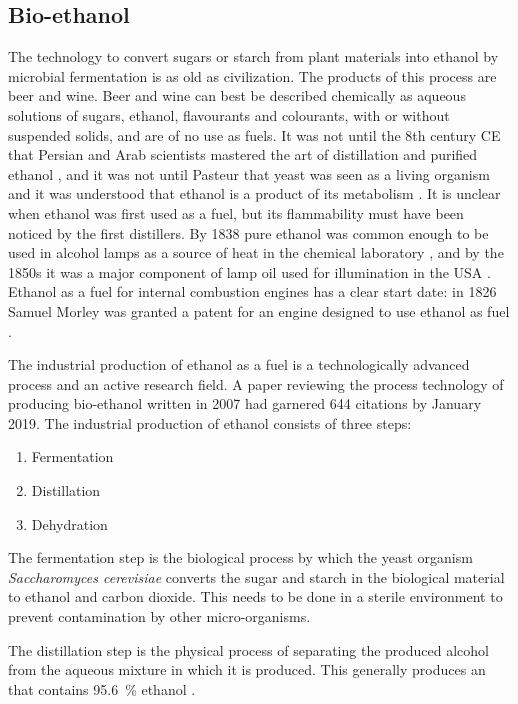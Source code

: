 \subsection{Bio-ethanol}
\label{sec:BioEthanol}

The technology to convert sugars or starch from plant materials into ethanol by
microbial fermentation is as old as civilization. The products of this process
are beer and wine.  Beer and wine can best be described chemically as aqueous
solutions of sugars, ethanol, flavourants and colourants, with or without
suspended solids, and are of no use as fuels. It was not until the 8th century
CE that Persian and Arab scientists mastered the art of distillation and
purified ethanol \autocite{Modanlou2008}, and it was not until Pasteur that
yeast was seen as a living organism and it was understood that ethanol is a
product of its metabolism \autocite{Barnett2000}. It is unclear when ethanol was
first used as a fuel, but its flammability must have been noticed by the first
distillers. By 1838 pure ethanol was common enough to be used in alcohol lamps as a
source of heat in the chemical laboratory \autocite{Griffin1838}, and by the
1850s it was a major component of lamp oil used for illumination in the USA
\autocite{Abebe2008}. Ethanol as a fuel for internal combustion engines has a
clear start date: in 1826 Samuel Morley was granted a patent for an engine
designed to use ethanol as fuel \autocite[p.79]{Cummins1989}.

The industrial production of ethanol as a fuel is a technologically advanced
process and an active research field. A paper \autocite{Cardona2007}
reviewing the process technology of producing bio-ethanol written in 2007 had
garnered 644 citations by January 2019. The industrial production of ethanol
consists of three steps:

\begin{enumerate}
  \item Fermentation
  \item Distillation
  \item Dehydration
\end{enumerate} 

The fermentation step is the biological process by which the yeast organism
\textit{Saccharomyces cerevisiae} converts the sugar and starch in the
biological material to ethanol and carbon dioxide. This needs to be done in a
sterile environment to prevent contamination by other micro-organisms.

The distillation step is the physical process of separating the produced alcohol
from the aqueous mixture in which it is produced. This generally produces an
 that contains \SI{95.6}{\percent} ethanol
\autocite{Kumar2010}.

